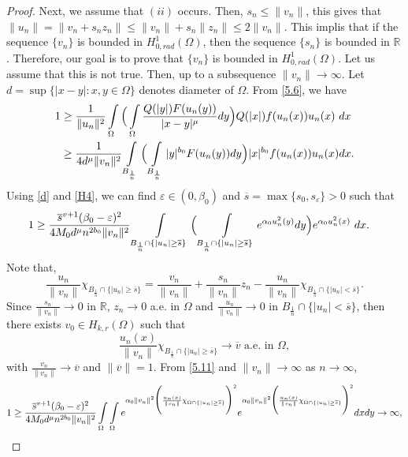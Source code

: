 \documentclass[11pt]{amsart}
\numberwithin{equation}{section}
\newcommand{\R}{\mathbb{R}}
\newcommand{\hr}{H^1_{0, rad}(\Omega)}
\newcommand{\1}{\frac{1}{2}}
\begin{document}
\begin{proof}
		Next, we assume that $(ii)$ occurs. Then, $s_n\leq \|v_n\|$, this gives that $\|u_n\|= \|v_n+ s_n z_n\| \leq \|v_n\|+ s_n \|z_n\|\leq 2 \|v_n\|$. This implis that if the sequence $\{v_n\}$ is bounded in $\hr$, then the sequence $\{s_n\}$ is bounded in $\R$. Therefore, our goal is to prove that $\{v_n\}$ is bounded in $\hr$. Let us assume that this is not true. Then, up to a subsequence $\|v_n\| \rightarrow \infty$. Let  $d= \sup\{ |x-y|: x,y \in \Omega\}$ denotes diameter of $\Omega$. From \eqref{5.6}, we have
		\begin{align}
			1 &\geq \frac{1}{\|u_n\|^2}\int\limits\limits_\Omega \Big( \int\limits\limits_\Omega \frac{Q(|y|)F(u_n(y))}{|x-y|^\mu}dy\Big) Q(|x|)f(u_n(x))u_n(x)\ dx \nonumber\\
			& \geq \frac{1}{4d^\mu \|v_n\|^2} \int\limits\limits_{ B_{\frac{1}{n}}} \Big( \int\limits\limits_{ B_{\frac{1}{n}}} |y|^{b_0}F(u_n(y))dy\Big) |x|^{b_0}f(u_n(x))u_n(x)dx. \nonumber 
		\end{align}
		Using \eqref{d} and \eqref{H4}, we can find $\varepsilon \in (0, \beta_0)$ and $\overline{s} = \max\{s_0, s_\varepsilon\}>0$ such that
		\begin{align}
			1 & \geq \frac{\overline{s}^{v+1}(\beta_0 - \varepsilon)^2}{4M_0d^\mu n^{2b_0} \|v_n\|^2} \int\limits\limits_{ B_{\frac{1}{n}} \cap \{|u_n| \geq \overline{s}\}} \Big( \int\limits\limits_{ B_{\frac{1}{n}} \cap \{|u_n| \geq \overline{s}\}} e^{\alpha_0 u_n^2(y)}dy\Big) e^{\alpha_0 u_n^2(x)}\ dx. \label{5.11}
		\end{align}
		Note that,
		\[ \frac{u_n}{\|v_n\|} \chi_{ B_{\frac{1}{n}} \cap \{|u_n| \geq \overline{s}\}} = \frac{v_n}{\|v_n\|} + \frac{s_n}{\|v_n\|}z_n - \frac{u_n}{\|v_n\|} \chi_{ B_{\frac{1}{n}} \cap \{|u_n| < \overline{s}\}}.\]
		Since $\frac{s_n}{\|v_n\|} \rightarrow 0$ in $\R$, $z_n \rightarrow 0$ a.e. in $\Omega$ and $\frac{u_n}{\|v_n\|} \rightarrow 0$ in $ B_{\frac{1}{n}} \cap \{|u_n| < \overline{s}\}$, then there exists $v_0 \in H_{k,r}(\Omega)$ such that 
		\begin{equation*}
			\frac{u_n(x)}{\|v_n\|} \chi_{ B_{\frac{1}{n}} \cap \{ |u_n| \geq \overline{s}\}} \rightarrow \overline{v} \text{ a.e. in } \Omega,
		\end{equation*}
		with $\frac{v_n}{\|v_n\|} \rightarrow \overline{v}$ and $\|\overline{v}\|=1$. From \eqref{5.11} and $\|v_n\| \to \infty$ as $n\to \infty$, 
		\begin{equation*}
			1\geq \frac{\overline{s}^{v+1}(\beta_0 - \varepsilon)^2}{4M_0d^\mu n^{2b_0}\|v_n\|^2} \int\limits\limits_\Omega \int\limits\limits_\Omega e^{\alpha_0 \|v_n\|^2 \Bigg( \frac{u_n(x)}{\|v_n\|} \chi_{\Omega \cap \{ |u_n| \geq \overline{s}\}}\Bigg)^2} e^{\alpha_0 \|v_n\|^2 \Bigg( \frac{u_n(x)}{\|v_n\|} \chi_{\Omega \cap \{ |u_n| \geq \overline{s}\}}\Bigg)^2}dx dy\rightarrow \infty, 

\end{equation*}
\end{proof}
\end{document}
